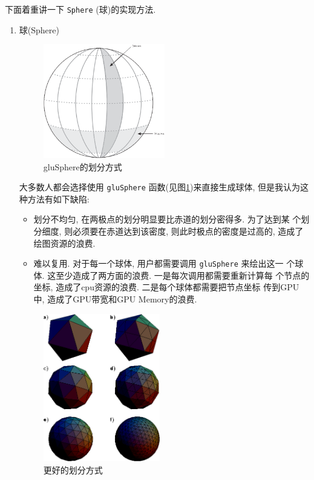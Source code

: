 \documentclass[11pt]{article}
\begin{document}
下面着重讲一下 \texttt{Sphere} (球)的实现方法.
\begin{enumerate}
\item 球(Sphere)
\label{sec-3-4-3-1}
\begin{figure}[h]
\centering
\includegraphics[width=0.50\textwidth]{gluSphere.png}
\caption{gluSphere的划分方式}
\label{fig:gluSphere}
\end{figure}

大多数人都会选择使用 \texttt{gluSphere} 函数(见图\ref{fig:gluSphere})来直接生成球体, 但是我认为这
种方法有如下缺陷:
\begin{itemize}
\item 划分不均匀, 在两极点的划分明显要比赤道的划分密得多. 为了达到某
个划分细度, 则必须要在赤道达到该密度, 则此时极点的密度是过高的,
造成了绘图资源的浪费.
\item 难以复用. 对于每一个球体, 用户都需要调用 \texttt{gluSphere} 来绘出这一
个球体. 这至少造成了两方面的浪费. 一是每次调用都需要重新计算每
个节点的坐标, 造成了cpu资源的浪费. 二是每个球体都需要把节点坐标
传到GPU中, 造成了GPU带宽和GPU Memory的浪费.
\end{itemize}

\begin{figure}[h]
\centering
\includegraphics[width=0.48\textwidth]{sphere.png}
\caption{更好的划分方式}
\label{fig:sphere}
\end{figure}


\end{enumerate}
\end{document}
